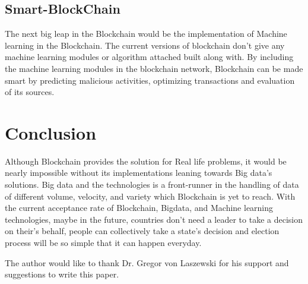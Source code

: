 \documentclass[sigconf]{acmart}
\begin{document}
\subsection{Smart-BlockChain}
The next big leap in the Blockchain would be the implementation of Machine learning in the Blockchain. The current versions of blockchain don't give any machine learning modules or algorithm attached built along with. By including the machine learning modules in the blockchain network, Blockchain can be made smart by predicting malicious activities, optimizing transactions and evaluation of its sources.


\section{Conclusion}
Although Blockchain provides the solution for  Real life problems, it would be nearly impossible without its implementations leaning towards Big data's solutions. Big data and the technologies is a front-runner in the handling of data of different volume, velocity, and variety which Blockchain is yet to reach. With the current acceptance rate of Blockchain, Bigdata, and Machine learning technologies, maybe in the future, countries don't need a leader to take a decision on their's behalf, people can collectively take a state's decision and election process will be so simple that it can happen everyday.



\begin{acks}

  The author would like to thank Dr. Gregor von Laszewski for his
  support and suggestions to write this paper.

\end{acks}


 
\end{document}
